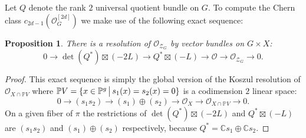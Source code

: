 \documentclass{amsart}
\newtheorem{proposition}[theorem]{Proposition}
\theoremstyle{definition}
\newcommand{\C}{\mathbb{C}}
\begin{document}
Let $Q$ denote the rank $2$ universal quotient bundle on $G$.
To compute the Chern class $c_{2d-1}(\mathcal{O}_G^{[2d]})$ we make
use of the following exact sequence:

\begin{proposition} \label{koszul}
There is a resolution of $\mathcal{O}_{\mathcal{Z}_G}$ by vector bundles on $G\times X$:
$$0\to \det(Q^*)\boxtimes (-2L) \to Q^*\boxtimes (-L)\to \mathcal{O} \to \mathcal{O}_{\mathcal{Z}_G} \to 0.$$
\end{proposition}

\begin{proof} This exact sequence is simply the 
global version of the Koszul resolution of $\mathcal{O}_{X\cap \mathbb{P}V}$ 
where $\mathbb{P}V=\{x\in \mathbb{P}^g\,\big{|}\, s_1(x)=s_2(x)=0\}$
is a codimension $2$ linear space:
$$0\to (s_1s_2)\to (s_1)\oplus (s_2)\to \mathcal{O}_X \to \mathcal{O}_{X\cap \mathbb{P}V}\to 0.$$
On a given fiber of $\pi$ the restrictions of $\det(Q^*)\boxtimes (-2L)$
and $Q^*\boxtimes (-L)$ are $(s_1s_2)$ and $(s_1)\oplus (s_2)$ respectively,
because $Q^*=\C s_1\oplus \C s_2$.
\end{proof}
\end{document}
